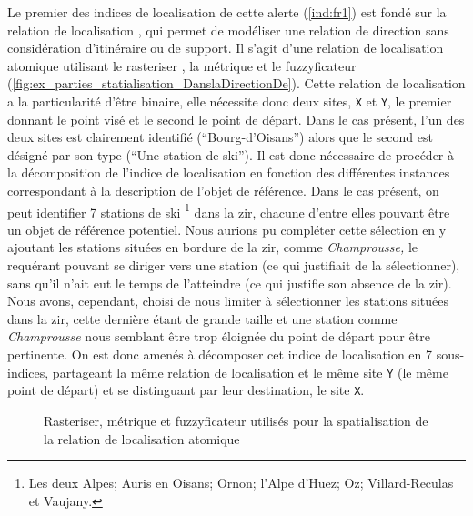 Le premier des indices de localisation de cette alerte (\ref{ind:fr1})
est fondé sur la relation de localisation
, qui permet de
modéliser une relation de direction sans considération d'itinéraire ou
de support. Il s'agit d'une relation de localisation atomique
utilisant le rasteriser , la métrique
 et le fuzzyficateur
(\autoref{fig:ex_parties_statialisation_DanslaDirectionDe}). Cette
relation de localisation a la particularité d'être binaire, elle
nécessite donc deux sites, \texttt{X} et \texttt{Y}, le premier
donnant le point visé et le second le point de départ. Dans le cas
présent, l'un des deux sites est clairement identifié
(\enquote{Bourg-d'Oisans}) alors que le second est désigné par son
type (\enquote{Une station de ski}). Il est donc nécessaire de
procéder à la décomposition de l'indice de localisation en fonction
des différentes instances correspondant à la description de l'objet de
référence. Dans le cas présent, on peut identifier 7 stations de ski
\footnote{Les deux Alpes; Auris en Oisans; Ornon; l'Alpe d'Huez; Oz;
  Villard-Reculas et Vaujany.}  dans la \ac{zir}, chacune d'entre
elles pouvant être un objet de référence potentiel. Nous aurions pu
compléter cette sélection en y ajoutant les stations situées en
bordure de la \ac{zir}, comme \emph{Champrousse,} le requérant pouvant
se diriger vers une station (ce qui justifiait de la sélectionner),
sans qu'il n'ait eut le temps de l'atteindre (ce qui justifie son
absence de la \ac{zir}). Nous avons, cependant, choisi de nous limiter
à sélectionner les stations situées dans la \ac{zir}, cette dernière
étant de grande taille et une station comme \emph{Champrousse} nous
semblant être trop éloignée du point de départ pour être pertinente.
On est donc amenés à décomposer cet indice de localisation en 7
sous-indices, partageant la même relation de localisation et le même
site \texttt{Y} (\ie le même point de départ) et se distinguant par
leur destination, le site \texttt{X}.

\begin{figure}
  \centering
  
  \caption{Rasteriser, métrique et fuzzyficateur utilisés pour la
    spatialisation de la relation de localisation atomique
    \protect{}}
  \label{fig:ex_parties_statialisation_DanslaDirectionDe}
\end{figure}

